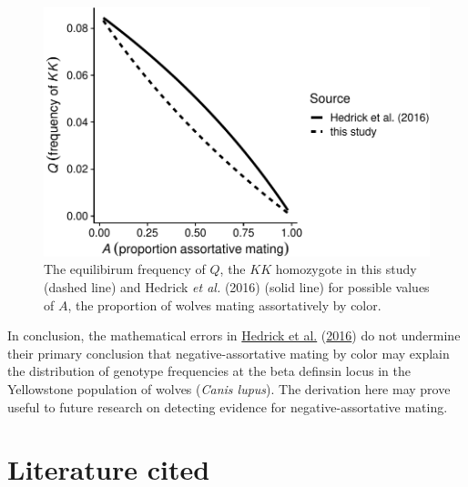\documentclass[
]{article}
\begin{document}
\begin{figure}

{\centering \includegraphics{ms_files/figure-latex/fig1-1} 

}

\caption{The equilibirum frequency of $Q$, the $KK$ homozygote in this study (dashed line) and Hedrick \textit{et al.} (2016) (solid line) for possible values of $A$, the proportion of wolves mating assortatively by color.}\label{fig:fig1}
\end{figure}

In conclusion, the mathematical errors in \protect\hyperlink{ref-hedrick_negative-assortative_2016}{Hedrick et al.} (\protect\hyperlink{ref-hedrick_negative-assortative_2016}{2016}) do not undermine their primary conclusion that negative-assortative mating by color may explain the distribution of genotype frequencies at the beta definsin locus in the Yellowstone population of wolves (\emph{Canis lupus}). The derivation here may prove useful to future research on detecting evidence for negative-assortative mating.

\hypertarget{literature-cited}{%
\section*{Literature cited}\label{literature-cited}}
\end{document}
